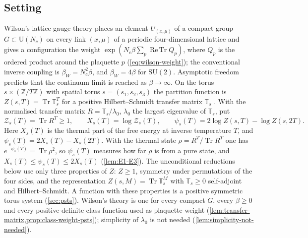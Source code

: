 \documentclass[11pt,a4paper]{amsart}
\theoremstyle{definition}
\theoremstyle{remark}
\numberwithin{equation}{section}
\DeclareMathOperator{\Tr}{Tr}        %
\DeclareMathOperator{\ReTr}{Re\,Tr}  %
\newcommand{\Z}{\mathbb{Z}}          %
\newcommand{\SU}{\mathrm{SU}}              %
\newcommand{\U}{\mathrm{U}}                %
\newcommand{\TT}{\mathbb{T}}               %
\newcommand{\Zpart}[2]{Z(#1,#2)}           %
\newcommand{\Zc}{\mathcal{Z}}              %
\newcommand{\Zs}[2]{\Zc_{#1}(#2)}          %
\newcommand{\XT}[2]{X_{#1}(#2)}            %
\newcommand{\psiT}[2]{\psi_{#1}(#2)}       %
\newcommand{\lzero}{\lambda_0}             %
\newcommand{\betaW}{\beta_{W}}             %
\begin{document}
\subsection{Setting}
Wilson's lattice gauge theory \cite{wilson1974} places an element $U_{(x,\mu)}$ of a compact group $G\subset\U(N_c)$ on every link $(x,\mu)$ of a periodic four-dimensional lattice and gives a configuration the weight $\exp(N_c\beta\sum_p\ReTr Q_p)$, where $Q_p$ is the ordered product around the plaquette $p$ (\cref{eq:wilson-weight}); the conventional inverse coupling is $\betaW=N_c^2\beta$, and $\betaW=4\beta$ for $\SU(2)$. Asymptotic freedom \cite{gross1973,politzer1973} predicts that the continuum limit is reached as $\beta\to\infty$. On the torus $s\times(\Z/T\Z)$ with spatial torus $s=(s_1,s_2,s_3)$ the partition function is $\Zpart{s}{T}=\Tr\TT_s^{T}$ for a positive Hilbert--Schmidt transfer matrix $\TT_s$ \cite{osterwalder1978,luscher1977,creutz1977}. With the normalised transfer matrix $R=\TT_s/\lzero$, $\lzero$ the largest eigenvalue of $\TT_s$, put
\begin{equation*}
\Zs{s}{T}=\Tr R^{T}\ge1,\qquad \XT{s}{T}=\log\Zs{s}{T},\qquad \psiT{s}{T}=2\log\Zpart{s}{T}-\log\Zpart{s}{2T}.
\end{equation*}
Here $\XT{s}{T}$ is the thermal part of the free energy at inverse temperature $T$, and $\psiT{s}{T}=2\XT{s}{T}-\XT{s}{2T}$. With the thermal state $\rho=R^{T}/\Tr R^{T}$ one has $e^{-\psiT{s}{T}}=\Tr\rho^2$, so $\psiT{s}{T}$ measures how far $\rho$ is from a pure state, and $\XT{s}{T}\le\psiT{s}{T}\le2\XT{s}{T}$ (\cref{lem:E1-E3}). The unconditional reductions below use only three properties of $Z$: $Z\ge1$, symmetry under permutations of the four sides, and the representation $\Zpart{s}{M}=\Tr\TT_s^{M}$ with $\TT_s\ge0$ self-adjoint and Hilbert--Schmidt. A function with these properties is a positive symmetric torus system (\cref{sec:psts}). Wilson's theory is one for every compact $G$, every $\beta\ge0$ and every positive-definite class function used as plaquette weight (\cref{lem:transfer-matrix,prop:class-weight-psts}); simplicity of $\lzero$ is not needed (\cref{lem:simplicity-not-needed}).
\end{document}
